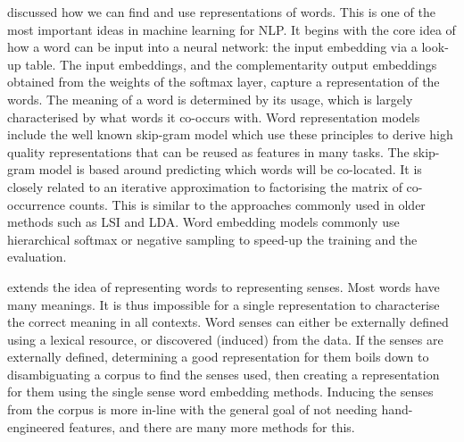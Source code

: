 \documentclass[12pt,parskip]{komatufte}
\begin{document}

 discussed how we can find and use representations of words.
This is one of the most important ideas in machine learning for NLP.
It begins with the core idea of how a word can be input into a neural network:
the input embedding via a look-up table.
The input embeddings, and the complementarity output embeddings obtained from the weights of the softmax layer, capture a representation of the words.
The meaning of a word is determined by its usage, which is largely characterised by what words it co-occurs with.
Word representation models include the well known skip-gram model which use these principles to derive high quality representations that can be reused as features in many tasks.
The skip-gram model is based around predicting which words will be co-located.
It is closely related to an iterative approximation to factorising the matrix of co-occurrence counts.
This is similar to the approaches commonly used in older methods such as LSI and LDA.
Word embedding models commonly use  hierarchical softmax or negative sampling to speed-up the training and the evaluation.



 extends the idea of representing words to representing senses.
Most words have many meanings.
It is thus impossible for a single representation to characterise the correct meaning in all contexts.
Word senses can either be externally defined using a lexical resource,
or discovered (induced) from the data.
If the senses are externally defined, determining a good representation for them boils down to disambiguating a corpus to find the senses used, then creating a representation for them using the single sense word embedding methods.
Inducing the senses from the corpus is more in-line with the general goal of not needing hand-engineered features, and there are many more methods for this.
\end{document}

